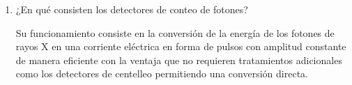 \begin{enumerate}[1.]
\item ¿En qué consisten los detectores de conteo de fotones?

Su funcionamiento consiste en la conversión de la energía de los fotones de rayos X en una corriente eléctrica en forma de pulsos con amplitud constante de manera eficiente con la ventaja que no requieren tratamientos adicionales como los detectores de centelleo permitiendo una conversión directa.

\end{enumerate}











